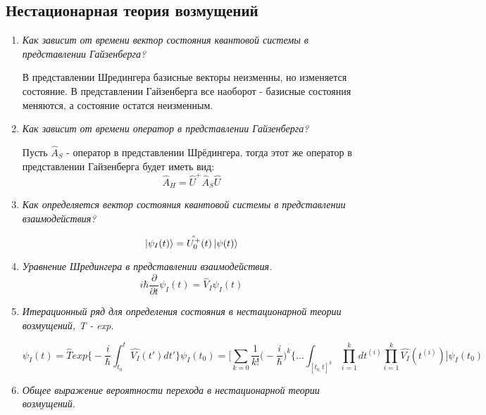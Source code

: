 \documentclass{article}
\begin{document}
\subsection*{Нестационарная теория возмущений}
\begin{enumerate}
	\item \textit{Как зависит от времени вектор состояния квантовой системы в представлении Гайзенберга?}
	
	В представлении Шредингера базисные векторы неизменны, но изменяется
состояние. В представлении Гайзенберга все наоборот - базисные состояния
меняются, а состояние остатся неизменным.
	
	\item \textit{Как зависит от времени оператор в представлении Гайзенберга?}
	
	Пусть $\hat{A}_S$ - оператор в представлении Шрёдингера, тогда этот же оператор в представлении Гайзенберга будет иметь вид:
	\begin{equation}
		\hat{A}_{H}=\hat{U}^{+}\hat{A}_{S}\hat{U}
	\end{equation}
	
	\item \textit{Как определяется вектор состояния квантовой системы в представлении взаимодействия?}
	
	\begin{equation}
		\ket{\psi_{I}(t)}=\hat{U_{0}^{+}}(t)\ket{\psi(t)}
	\end{equation}
	
	\item \textit{Уравнение Шредингера в представлении взаимодействия.}
	\begin{equation}
		i\hbar\frac{\partial}{\partial t}\psi_{I}(t)=\hat{V}_{I}\psi_{I}(t)
	\end{equation}
	
	\item \textit{Итерационный ряд для определения состояния в нестационарной теории возмущений, T - exp.}
	
	\begin{equation}
		\psi_{I}(t)=\hat{T}exp\big\{-\frac{i}{\hbar}\int_{t_{0}}^{t}\hat{V_{I}}(t')dt'\big\}\psi_{I}(t_{0})=\big[\sum_{k=0}\frac{1}{k!}\big(-\frac{i}{\hbar}\big)^{k}\big\{\dots \int_{[t_{0,}t]^{k}}\prod_{i=1}^{k}dt^{(i)}\prod_{i=1}^{k}\hat{V_{I}}(t^{(i)})\big]\psi_{I}(t_{0})
	\end{equation}
	
	\item \textit{Общее выражение вероятности перехода в нестационарной теории возмущений.}
	

\end{enumerate}
\end{document}
